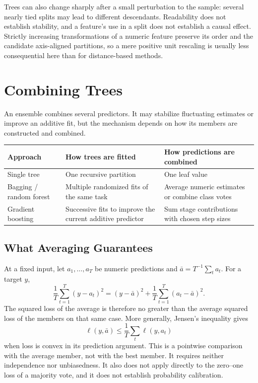 Trees can also change sharply after a small perturbation to the sample: several nearly tied splits may lead to different descendants. Readability does not establish stability, and a feature's use in a split does not establish a causal effect. Strictly increasing transformations of a numeric feature preserve its order and the candidate axis-aligned partitions, so a mere positive unit rescaling is usually less consequential here than for distance-based methods.

\section{Combining Trees}

An ensemble combines several predictors. It may stabilize fluctuating estimates or improve an additive fit, but the mechanism depends on how its members are constructed and combined.

\par\addvspace{\intextsep}\noindent\begin{minipage}{\linewidth}
\centering\small
\begin{tabular}{@{}L{2.2cm}L{4.0cm}L{3.85cm}@{}}
\toprule
Approach & How trees are fitted & How predictions are combined \\
\midrule
Single tree & One recursive partition & One leaf value \\
Bagging / random forest & Multiple randomized fits of the same task & Average numeric estimates or combine class votes \\
Gradient boosting & Successive fits to improve the current additive predictor & Sum stage contributions with chosen step sizes \\
\bottomrule
\end{tabular}
\label{tab:tree-ensemble-comparison}
\end{minipage}\par\addvspace{\intextsep}

\subsection{What Averaging Guarantees}

At a fixed input, let $a_1,\ldots,a_T$ be numeric predictions and $\bar a=T^{-1}\sum_t a_t$. For a target $y$,
\[
\frac1T\sum_{t=1}^T(y-a_t)^2
=(y-\bar a)^2+\frac1T\sum_{t=1}^T(a_t-\bar a)^2.
\]
The squared loss of the average is therefore no greater than the average squared loss of the members on that same case. More generally, Jensen's inequality gives
\[
\ell(y,\bar a)\le\frac1T\sum_t\ell(y,a_t)
\]
when loss is convex in its prediction argument. This is a pointwise comparison with the average member, not with the best member. It requires neither independence nor unbiasedness. It also does not apply directly to the zero--one loss of a majority vote, and it does not establish probability calibration.

